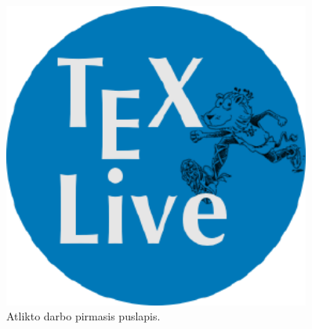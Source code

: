 \documentclass[portrait]{article}
\begin{document}

\maketitle

\begin{abstract}
Atliktas darbas pateiktas pav.~\ref{fig-report}.
\end{abstract}

\begin{figure}[b]
\includegraphics[height=0.8\textheight,width=0.9\textwidth]{texlive.png}
\caption{Atlikto darbo pirmasis puslapis.}
\label{fig-report}
\end{figure}
\end{document}
